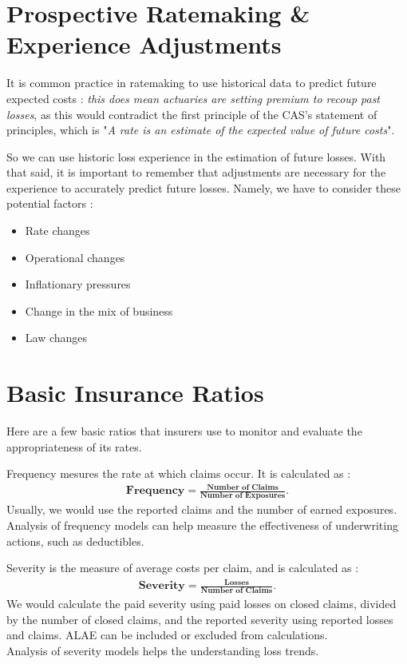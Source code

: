 \documentclass[11pt, english]{memoir}
\numberwithin{definition}{section}
\begin{document}
\section{Prospective Ratemaking \& Experience Adjustments}
It is common practice in ratemaking to use historical data to predict future expected costs : \emph{this does mean actuaries are setting premium to recoup past losses}, as this would contradict the first principle of the CAS's statement of principles, which is "\emph{A rate is an estimate of the expected value of future costs}".

So we can use historic loss experience in the estimation of future losses. With that said, it is important to remember that adjustments are necessary for the experience to accurately  predict future losses. Namely, we have to consider these potential factors : 
\begin{itemize}
\item Rate changes
\item Operational changes 
\item Inflationary pressures 
\item Change in the mix of business
\item Law changes
\end{itemize}



\section{Basic Insurance Ratios}
Here are a few basic ratios that insurers use to monitor and evaluate the appropriateness of its rates. 


\begin{tcolorbox}[adjusted title = \textbf{Frequency}, bottomrule = 0mm, leftrule = 0mm, rightrule = 0mm, toprule = 0mm]
Frequency mesures the rate at which claims occur. It is calculated as :
\begin{align*}
\textbf{Frequency} = \frac{\textbf{Number of Claims}}{\textbf{Number of Exposures}}.
\end{align*}
Usually, we would use the reported claims and the number of earned exposures. Analysis of frequency models can help measure the effectiveness of underwriting actions, such as deductibles. 
\end{tcolorbox}


\begin{tcolorbox}[adjusted title = \textbf{Severity}, boxrule = 0mm]
Severity is the measure of average costs per claim, and is calculated as : 
\begin{align*}
\textbf{Severity} = \frac{\textbf{Losses}}{\textbf{Number of Claims}}.
\end{align*}
We would calculate the paid severity using paid losses on closed claims, divided by the number of closed claims, and the reported severity using reported losses and claims. ALAE can be included or excluded from calculations. \\

Analysis of severity models helps the understanding loss trends. 
\end{tcolorbox}
\end{document}
